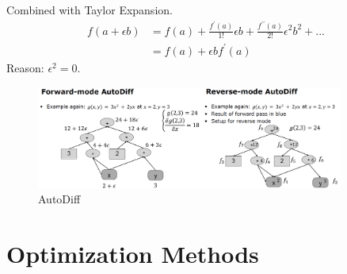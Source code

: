 \documentclass[a4paper]{article}
\begin{document}
Combined with Taylor Expansion.
\begin{align}
	f(a + \epsilon b) &= f(a) + \frac{f^{\prime} (a)}{1!} \epsilon b + \frac{f^{\prime \prime}(a)}{2!} \epsilon^2 b^2 + ... \\
	&= f(a) + \epsilon b f^{\prime} (a)
\end{align}
Reason: $\epsilon^2 = 0$. 
\begin{figure}[h]
	\centering
	\includegraphics[width=0.9\textwidth]{images/autodiffcombine.png}
	\caption{AutoDiff}
	\label{fig:autodiff}
\end{figure}


\section{Optimization Methods}
\end{document}

